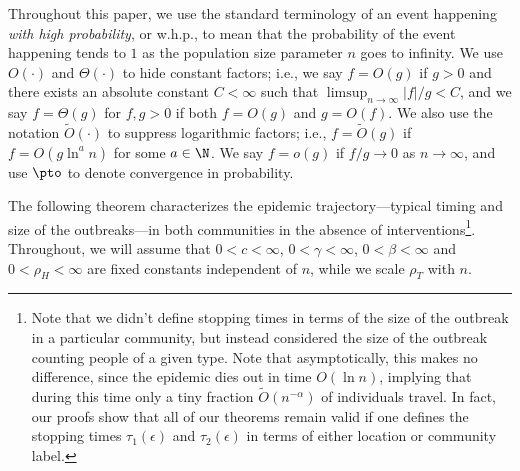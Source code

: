 \documentclass[11pt]{article}
\begin{document}
Throughout this paper, we use the standard terminology of an event happening \emph{with high probability}, or w.h.p., to mean that the probability of the event happening tends to $1$ as the population size parameter $n$ goes to infinity. We use $O(\cdot)$ and $\Theta(\cdot)$ to hide constant factors; i.e., we say $f = O(g)$ if $g>0$ and there exists an absolute constant $C<\infty$ such that $\limsup_{n\to\infty} |f|/g < C$, and we say  $f=\Theta(g)$ for $f,g>0$ if both $f=O(g)$ and $g=O(f)$.
We also use the notation $\tilde O(\cdot)$ to suppress logarithmic factors; i.e., $f = \tilde O(g)$ if $f = O(g \ln^a n)$ for some $a\in\N$. We say $f = o(g)$ if $f/g\to 0$ as $n\to\infty$, and use $\pto$ to denote convergence in probability.

The following theorem characterizes the epidemic trajectory---typical timing and size of the outbreaks---in both communities in the absence of interventions\footnote{Note that we didn't define stopping  times in terms of the size of the outbreak in a particular community, but instead considered the size of the outbreak counting people of a given type. Note that asymptotically, this makes no difference, since the epidemic dies out in time $O(\ln n)$, implying that during this time only a tiny fraction $\tilde O(n^{-\alpha})$ of individuals  travel.  In fact, our proofs show that all of our theorems remain valid if one defines the stopping times $\tau_1(\epsilon)$ and $\tau_2(\epsilon)$ in terms of either location or community label.}.
Throughout, we will assume that $0<c<\infty$, $0<\gamma<\infty$, $0<\beta<\infty$ and $0<\rho_H<\infty$ are fixed constants independent of $n$, while we scale $\rho_T$ with $n$.
\end{document}
